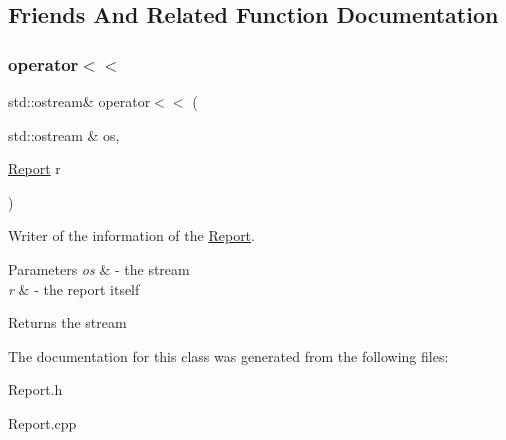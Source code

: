 \subsection{Friends And Related Function Documentation}
\mbox{\label{class_report_a9c2eaa693abfadab4a6e151daee874e4}} 
\subsubsection{\texorpdfstring{operator$<$$<$}{operator<<}}
{\footnotesize\ttfamily std\+::ostream\& operator$<$$<$ (\begin{DoxyParamCaption}\item[{std\+::ostream \&}]{os,  }\item[{\mbox{\hyperlink{class_report}{Report}}}]{r }\end{DoxyParamCaption})\hspace{0.3cm}{\ttfamily [friend]}}



Writer of the information of the \mbox{\hyperlink{class_report}{Report}}. 


\begin{DoxyParams}{Parameters}
{\em os} & -\/ the stream \\
\hline
{\em r} & -\/ the report itself \\
\hline
\end{DoxyParams}
\begin{DoxyReturn}{Returns}
the stream 
\end{DoxyReturn}


The documentation for this class was generated from the following files\+:\begin{DoxyCompactItemize}
\item 
Report.\+h\item 
Report.\+cpp\end{DoxyCompactItemize}
